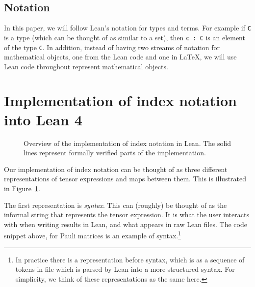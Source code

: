 \documentclass[a4paper, 11pt]{article}
\begin{document}
\subsection*{Notation}
In this paper, we will follow Lean's notation for types and terms. 
For example if \lstinline|C| is a type (which can be thought of as similar to a set),
then \lstinline|c : C| is an element of the type \lstinline|C|. 
In addition, instead of having two streams of notation for mathematical objects, one from the Lean 
code and one in LaTeX, we will use Lean code throughout represent mathematical objects.
\section{Implementation of index notation into Lean 4}\label{sec:Implementation}

\begin{figure}
  \centering
  \caption{Overview of the implementation of index notation in Lean. The 
  solid lines represent formally verified parts of the implementation.}
  \label{fig:overviewFlow}
\end{figure}

Our implementation of index notation can be thought of as three different representations of tensor 
expressions and maps between them. This is illustrated in Figure~\ref{fig:overviewFlow}.

The first representation is \emph{syntax}. This can (roughly) be thought of as the informal string
that represents the tensor expression. It is what the user interacts with when 
writing results in Lean, and what appears in raw Lean files. The code snippet above, 
for Pauli matrices is an example of syntax.\footnote{In practice there is a representation before syntax, 
 which is as a sequence of tokens in file which is parsed by Lean into a more structured syntax. For simplicity,
 we think of these representations as the same here.} 
\end{document}
